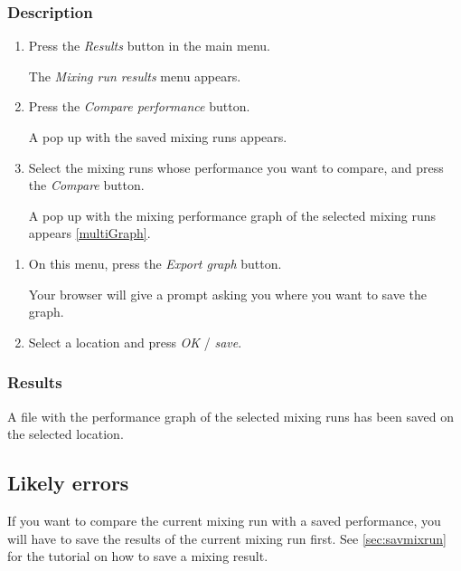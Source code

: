 \subsubsection{Description}
\begin{enumerate}
	\item Press the \emph{Results} button in the main menu.
		\begin{itemize}
            The \emph{Mixing run results} menu appears. 
		\end{itemize}
	\item Press the \emph{Compare performance} button.
		\begin{itemize}
            A pop up with the saved mixing runs appears. 
		\end{itemize}
	\item Select the mixing runs whose performance you want to compare, and press the \emph{Compare} button.  
		\begin{itemize}
            A pop up with the mixing performance graph of the selected mixing runs appears \ref{multiGraph}.
		\end{itemize}
\end{enumerate}
\begin{enumerate}
	\item On this menu, press the \emph{Export graph} button. 
        \begin{itemize}
            Your browser will give a prompt asking you where you want to save the graph.
        \end{itemize}
	\item  Select a location and press \emph{OK} / \emph{save}.
\end{enumerate}


\subsubsection{Results}
A file with the performance graph of the selected mixing runs has been saved on the selected location.

\subsection{Likely errors}
If you want to compare the current mixing run with a saved performance, you will have to save the results of the current mixing run first. See \ref{sec:savmixrun} for the tutorial on how to save a mixing result.

